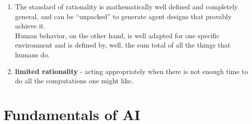 \begin{enumerate}[itemsep=0.2cm]
\begin{enumerate}
        \item The standard of rationality is mathematically well defined and completely general, and can be “unpacked” to generate agent designs that provably achieve it.\\
        Human behavior, on the other hand, is well adapted for one specific environment and is defined by, well, the sum total of all the things that humans do.

        \item \textbf{limited rationality} - acting appropriately when there is not enough time to do all the computations one might like.
    \end{enumerate}
\end{enumerate}

\section{Fundamentals of AI \cite{aci-1}}

